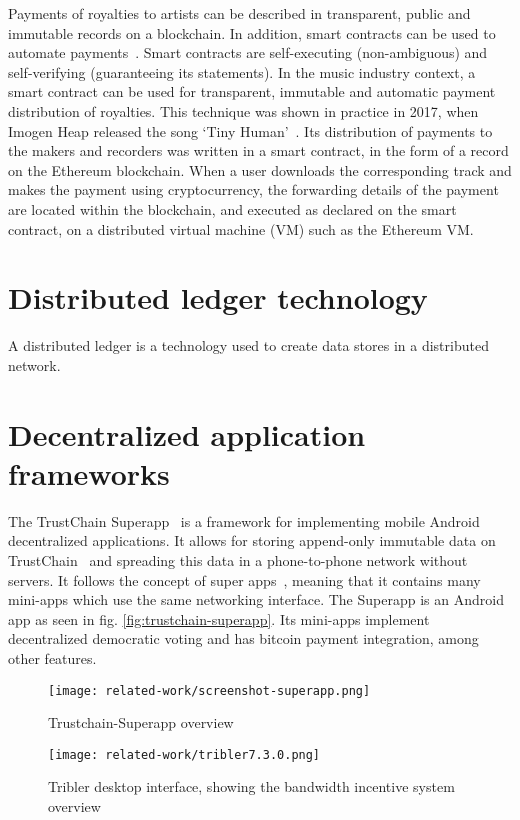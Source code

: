 Payments of royalties to artists can be described in transparent, public and immutable records on a blockchain. In addition, smart contracts can be used to automate payments~\citep{buterin2014next}. Smart contracts are self-executing (non-ambiguous) and self-verifying (guaranteeing its statements). In the music industry context, a smart contract can be used for transparent, immutable and automatic payment distribution of royalties. This technique was shown in practice in 2017, when Imogen Heap released the song `Tiny Human'~\citep{heap2017blockchain}. Its distribution of payments to the makers and recorders was written in a smart contract, in the form of a record on the Ethereum blockchain. When a user downloads the corresponding track and makes the payment using cryptocurrency, the forwarding details of the payment are located within the blockchain, and executed as declared on the smart contract, on a distributed virtual machine (VM) such as the Ethereum VM.

\section{Distributed ledger technology}
A distributed ledger is a technology used to create data stores in a distributed network. 

\section{Decentralized application frameworks}
\label{sec:sote-trustchain}
The TrustChain Superapp~\citep{mattskala2020} is a framework for implementing mobile Android decentralized applications. It allows for storing append-only immutable data on TrustChain~\citep{otte2017trustchain} and spreading this data in a phone-to-phone network without servers. It follows the concept of super apps~\citep{kpmg2019superapps}, meaning that it contains many mini-apps which use the same networking interface. The Superapp is an Android app as seen in fig. \ref{fig:trustchain-superapp}. Its mini-apps implement decentralized democratic voting and has bitcoin payment integration, among other features.

\begin{figure}
        \texttt{[image: related-work/screenshot-superapp.png]}
        \caption{Trustchain-Superapp overview}
        \label{fig:trustchain-superapp}
    \endminipage\hfill
        \texttt{[image: related-work/tribler7.3.0.png]}
        \caption{Tribler desktop interface, showing the bandwidth incentive system overview}
        \label{fig:tribler}
    \endminipage
\end{figure}

